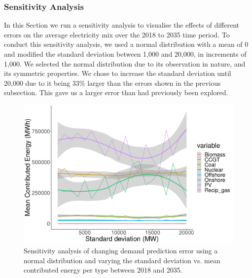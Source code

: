 \documentclass[final,3p,times,twocolumn,numbers]{elsarticle}
\begin{document}
%
%
%
%
%




\subsubsection{Sensitivity Analysis}

In this Section we run a sensitivity analysis to visualise the effects of different errors on the average electricity mix over the 2018 to 2035 time period. To conduct this sensitivity analysis, we used a normal distribution with a mean of 0 and modified the standard deviation between 1,000 and 20,000, in increments of 1,000. We selected the normal distribution due to its observation in nature, and its symmetric properties. We chose to increase the standard deviation until 20,000 due to it being 33\% larger than the errors shown in the previous subsection. This gave us a larger error than had previously been explored.



\begin{figure}[h]
\centering
\includegraphics[width=\columnwidth,natwidth=800]{figures/results/sensitivity_analysis.pdf}
\caption{Sensitivity analysis of changing demand prediction error using a normal distribution and varying the standard deviation vs. mean contributed energy per type between 2018 and 2035.}
\label{fig:sensitivity-analysis}
\end{figure}
\end{document}
